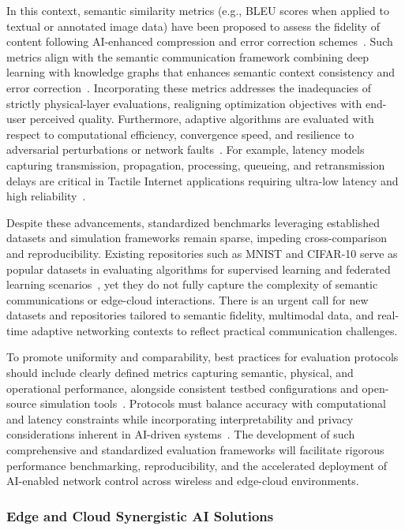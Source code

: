 \documentclass[sigconf]{acmart}
\begin{document}
In this context, semantic similarity metrics (e.g., BLEU scores when applied to textual or annotated image data) have been proposed to assess the fidelity of content following AI-enhanced compression and error correction schemes~\cite{ref1,ref3,ref50}. Such metrics align with the semantic communication framework combining deep learning with knowledge graphs that enhances semantic context consistency and error correction~\cite{ref1}. Incorporating these metrics addresses the inadequacies of strictly physical-layer evaluations, realigning optimization objectives with end-user perceived quality. Furthermore, adaptive algorithms are evaluated with respect to computational efficiency, convergence speed, and resilience to adversarial perturbations or network faults~\cite{ref5,ref7,ref10}. For example, latency models capturing transmission, propagation, processing, queueing, and retransmission delays are critical in Tactile Internet applications requiring ultra-low latency and high reliability~\cite{ref10}.

Despite these advancements, standardized benchmarks leveraging established datasets and simulation frameworks remain sparse, impeding cross-comparison and reproducibility. Existing repositories such as MNIST and CIFAR-10 serve as popular datasets in evaluating algorithms for supervised learning and federated learning scenarios~\cite{ref5}, yet they do not fully capture the complexity of semantic communications or edge-cloud interactions. There is an urgent call for new datasets and repositories tailored to semantic fidelity, multimodal data, and real-time adaptive networking contexts to reflect practical communication challenges.

To promote uniformity and comparability, best practices for evaluation protocols should include clearly defined metrics capturing semantic, physical, and operational performance, alongside consistent testbed configurations and open-source simulation tools~\cite{ref50}. Protocols must balance accuracy with computational and latency constraints while incorporating interpretability and privacy considerations inherent in AI-driven systems~\cite{ref7,ref50}. The development of such comprehensive and standardized evaluation frameworks will facilitate rigorous performance benchmarking, reproducibility, and the accelerated deployment of AI-enabled network control across wireless and edge-cloud environments.

\subsubsection{Edge and Cloud Synergistic AI Solutions}
\end{document}
